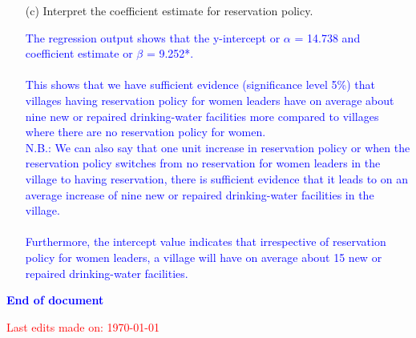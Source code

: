 \documentclass[12pt,letterpaper]{article}
\begin{document}
\begin{enumerate}
	\vspace{0.5cm}
	\item [(c)] Interpret the coefficient estimate for reservation policy. 

\vspace{0.2cm}

\textcolor{blue}{
	The regression output shows that the y-intercept or $\alpha$ = 14.738 and coefficient estimate or $\beta$ = 9.252*.\\
	\\This shows that we have sufficient evidence (significance level 5\%) that villages having reservation policy for women leaders have on average about nine new or repaired drinking-water facilities more compared to villages where there are no reservation policy for women.\\
	N.B.: We can also say that one unit increase in reservation policy or when the reservation policy switches from no reservation for women leaders in the village to having reservation, there is sufficient evidence that it leads to on an average increase of nine new or repaired drinking-water facilities in the village.\\
	\\Furthermore, the intercept value indicates that irrespective of reservation policy for women leaders, a village will have on average about 15 new or repaired drinking-water facilities.
}
\end{enumerate}
\vspace{2cm}
\begin{center}
	\textcolor{blue}{\textbf{End of document}\\}
\end{center}
\vspace{8cm}
\textcolor{red}{Last edits made on: \today}
\end{document}

